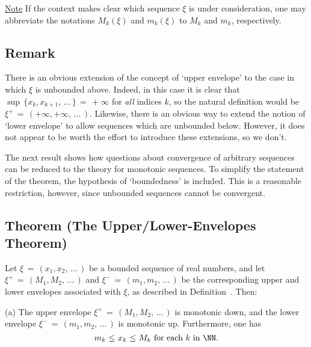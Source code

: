 {    \underline{Note} If the context makes clear which sequence ${\xi}$ is under consideration, one may abbreviate the notations $M_{k}({\xi})$ and $m_{k}({\xi})$ to $M_{k}$ and $m_{k}$, respectively.

\V

            \subsection{\small{\bf Remark}}
            \label{RemrkC50.50}

        There is an obvious extension of the concept of `upper envelope' to the case in which ${\xi}$ is unbounded above.
    Indeed, in this case it is clear that ${\sup}\,\{x_{k},x_{k+1},\,{\ldots}\,\} \,=\, +{\infty}$ for {\em all} indices $k$, so the natural definition would be ${\xi}^{+} \,=\, (+{\infty},+{\infty},\,{\ldots}\,)$.
    Likewise, there is an obvious way to extend the notion of `lower envelope' to allow sequences which are unbounded below.
    However, it does not appear to be worth the effort to introduce these extensions, so we don't.

\V
\V

        The next result shows how questions about convergence of arbitrary sequences can be reduced to the theory for monotonic sequences.
    To simplify the statement of the theorem, the hypothesis of `boundedness' is included.
    This is a reasonable restriction, however, since unbounded sequences cannot be convergent.

\V

            \subsection{\small{\bf Theorem} (The Upper/Lower-Envelopes Theorem)}
            \label{ThmC50.60}

        Let ${\xi} \,=\, (x_{1},x_{2},\,{\ldots}\,)$ be a bounded sequence of real numbers,
    and let ${\xi}^{+} \,=\, (M_{1},M_{2},\,{\ldots}\,)$ and ${\xi}^{-} \,=\, (m_{1},m_{2},\,{\ldots}\,)$
    be the corresponding upper and lower envelopes associated with ${\xi}$, as described in Definition~. Then:

        (a) The upper envelope ${\xi}^{+} \,=\, (M_{1},M_{2},\,{\ldots}\,)$ is monotonic down,
    and the lower envelope ${\xi}^{-} \,=\, (m_{1},m_{2},\,{\ldots}\,)$ is monotonic up.
    Furthermore, one has
        \begin{displaymath}
        m_{k}\,\,{\leq}\,\,x_{k}\,\,{\leq}\,\,M_{k} \mbox{ for each $k$ in ${\NN}$}.
        \end{displaymath}

}

